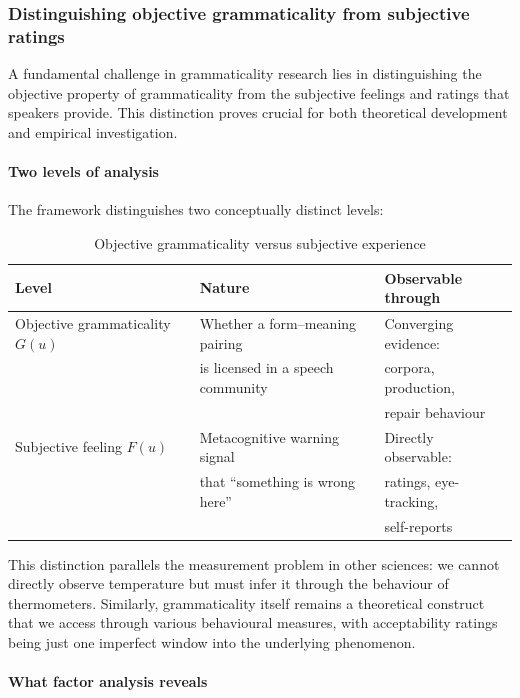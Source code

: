 \documentclass[12pt,letterpaper]{article}
\begin{document}
\subsubsection{Distinguishing objective grammaticality from subjective ratings}\label{sec:objective-subjective}

A fundamental challenge in grammaticality research lies in distinguishing the objective property of grammaticality from the subjective feelings and ratings that speakers provide. This distinction proves crucial for both theoretical development and empirical investigation.

\paragraph{Two levels of analysis}

The framework distinguishes two conceptually distinct levels:

\begin{table}[h]
\centering
\caption{Objective grammaticality versus subjective experience}
\label{tab:two-levels}
\begin{tabular}{@{}lll@{}}
\toprule
Level & Nature & Observable through\\
\midrule
Objective grammaticality $G(u)$ & Whether a form--meaning pairing & Converging evidence:\\
& is licensed in a speech community & corpora, production,\\
& & repair behaviour\\[6pt]
Subjective feeling $F(u)$ & Metacognitive warning signal & Directly observable:\\
& that ``something is wrong here'' & ratings, eye-tracking,\\
& & self-reports\\
\bottomrule
\end{tabular}
\end{table}

This distinction parallels the measurement problem in other sciences: we cannot directly observe temperature but must infer it through the behaviour of thermometers. Similarly, grammaticality itself remains a theoretical construct that we access through various behavioural measures, with acceptability ratings being just one imperfect window into the underlying phenomenon.

\paragraph{What factor analysis reveals}
\end{document}
